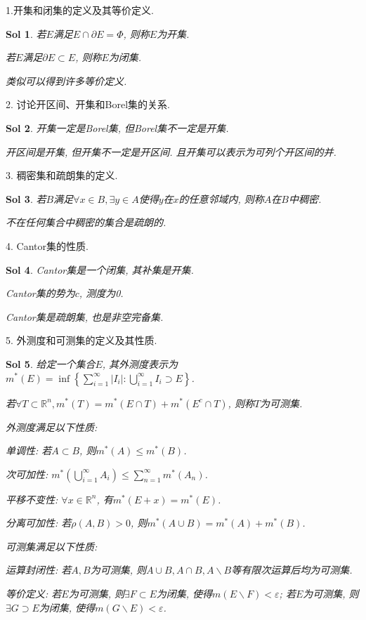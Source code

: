 \documentclass[UTF8]{article}
\newtheorem{solution}{Sol}
\begin{document}
    1.开集和闭集的定义及其等价定义. \par
    \begin{solution}
        若$E$满足$E\cap \partial E=\varPhi $, 则称$E$为开集.\par
        若$E$满足$\partial E\subset E$, 则称$E$为闭集.\par
        类似可以得到许多等价定义.\par
    \end{solution}
    2. 讨论开区间、开集和Borel集的关系.\par
    \begin{solution}
        开集一定是Borel集, 但Borel集不一定是开集.\par
        开区间是开集, 但开集不一定是开区间. 且开集可以表示为可列个开区间的并.\par
    \end{solution}
    3. 稠密集和疏朗集的定义.\par
    \begin{solution}
        若$B$满足$\forall x\in B, \exists y\in A$使得$y$在$x$的任意邻域内, 则称$A$在$B$中稠密.\par
        不在任何集合中稠密的集合是疏朗的.\par
    \end{solution}
    4. Cantor集的性质.\par
    \begin{solution}
        Cantor集是一个闭集, 其补集是开集.\par
        Cantor集的势为$c$, 测度为0.\par
        Cantor集是疏朗集, 也是非空完备集.\par
    \end{solution}
    5. 外测度和可测集的定义及其性质.\par
    \begin{solution}
        给定一个集合$E$, 其外测度表示为$m^{*}(E)=\inf \left\{\sum_{i=1}^{\infty}|I_i|: \bigcup_{i=1}^{\infty}I_i\supset E\right\} $.\par
        若$\forall T\subset \mathbb{R}^n, m^{*}(T)=m^{*}(E\cap T)+m^{*}(E^c\cap T)$, 则称$T$为可测集.\par
        外测度满足以下性质:\par
        单调性: 若$A\subset B$, 则$m^{*}(A)\leq m^{*}(B)$.\par
        次可加性: $m^{*}(\bigcup_{i=1}^{\infty}A_i)\leqslant \sum_{n=1}^{\infty}m^{*}(A_n)$.\par
        平移不变性: $\forall x\in \mathbb{R}^n$, 有$m^{*}(E+x)=m^{*}(E)$.\par
        分离可加性: 若$\rho(A,B)>0$, 则$m^{*}(A\cup B)=m^{*}(A)+m^{*}(B)$.\par
        可测集满足以下性质:\par
        运算封闭性: 若$A,B$为可测集, 则$A\cup B, A\cap B, A\backslash B$等有限次运算后均为可测集.\par
        等价定义: 若$E$为可测集, 则$\exists F\subset E$为闭集, 使得$m(E\backslash F)<\varepsilon$; 若$E$为可测集, 则$\exists G\supset E$为闭集, 使得$m(G\backslash E)<\varepsilon$.\par 
    \end{solution}
\end{document}
